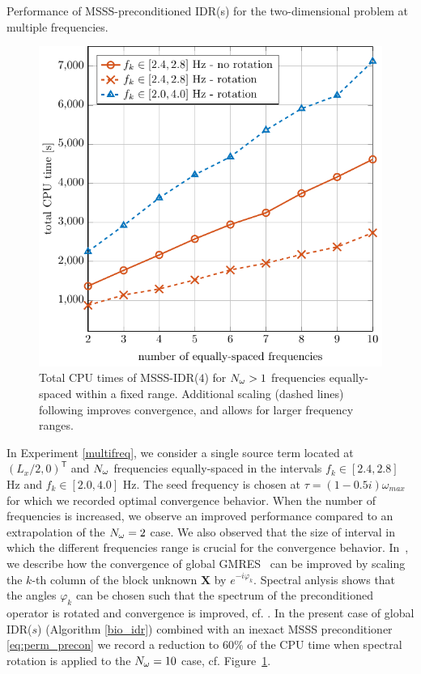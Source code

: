 \begin{exper}\label{multifreq}
Per\-for\-mance of MSSS-preconditioned IDR(s) for the two-di\-men\-sional \marmousi problem at multiple frequencies.
\end{exper}

 \begin{figure}[H]
 \centering
  \includegraphics[width=0.6\columnwidth]{ms_time.pdf}
  \caption{Total CPU times of MSSS-IDR($4$) for ${N_{\omega}} > 1$ frequencies equally-spaced within a fixed range. Additional scaling (dashed lines) following \cite{BvG17} improves convergence, and allows for larger frequency ranges.}\label{fig:multiF}
 \end{figure}
 In Experiment \ref{multifreq}, we consider a single source term located at $(L_x/2,0)^\mathsf{T}$ and ${N_{\omega}}$ frequencies equally-spaced in the intervals $f_k \in [2.4,2.8]$ Hz and $f_k \in [2.0,4.0]$ Hz. The seed frequency is chosen at $\tau = (1-0.5i)\omega_{max}$ for which we recorded optimal convergence behavior. When the number of frequencies is increased, we observe an improved performance compared to an extrapolation of the ${N_{\omega}}=2$ case. We also observed that the size of interval in which the different frequencies range is crucial for the convergence behavior. In~\cite{BvG17}, we describe how the convergence of global \mbox{GMRES \cite{JMS99}} can be improved by scaling the $k$-th column of the block unknown $\mathbf{X}$ by $e^{-i\varphi_k}$. Spectral anlysis shows that the angles $\varphi_k$ can be chosen such that the spectrum of the preconditioned operator is rotated and convergence is improved, cf. \cite{BvG17}.  In the present case of global IDR($s$) (Algorithm \ref{bio_idr}) combined with an inexact MSSS preconditioner \eqref{eq:perm_precon} we record a reduction to $60\%$ of the CPU time when spectral rotation is applied to the ${N_{\omega}}=10$ case, cf. Figure~\ref{fig:multiF}.
